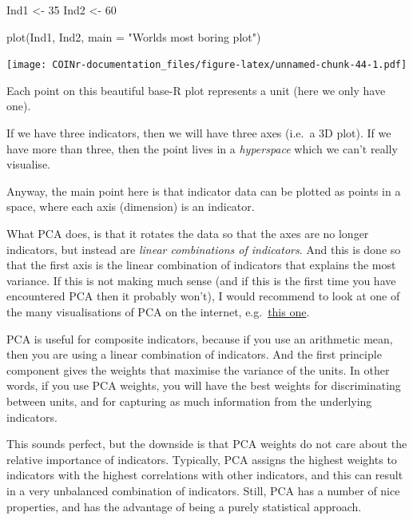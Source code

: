 \documentclass[
]{book}
\newenvironment{Shaded}{\begin{snugshade}}{\end{snugshade}}
\newcommand{\AttributeTok}[1]{\textcolor[rgb]{0.77,0.63,0.00}{#1}}
\newcommand{\DecValTok}[1]{\textcolor[rgb]{0.00,0.00,0.81}{#1}}
\newcommand{\FunctionTok}[1]{\textcolor[rgb]{0.00,0.00,0.00}{#1}}
\newcommand{\NormalTok}[1]{#1}
\newcommand{\OtherTok}[1]{\textcolor[rgb]{0.56,0.35,0.01}{#1}}
\newcommand{\StringTok}[1]{\textcolor[rgb]{0.31,0.60,0.02}{#1}}
\begin{document}
\begin{Shaded}
\begin{Highlighting}[]
\NormalTok{Ind1 }\OtherTok{\textless{}{-}} \DecValTok{35}
\NormalTok{Ind2 }\OtherTok{\textless{}{-}} \DecValTok{60}

\FunctionTok{plot}\NormalTok{(Ind1, Ind2, }\AttributeTok{main =} \StringTok{"World\textquotesingle{}s most boring plot"}\NormalTok{)}
\end{Highlighting}
\end{Shaded}

\texttt{[image: COINr-documentation\_files/figure-latex/unnamed-chunk-44-1.pdf]}

Each point on this beautiful base-R plot represents a unit (here we only have one).

If we have three indicators, then we will have three axes (i.e.~a 3D plot). If we have more than three, then the point lives in a \emph{hyperspace} which we can't really visualise.

Anyway, the main point here is that indicator data can be plotted as points in a space, where each axis (dimension) is an indicator.

What PCA does, is that it rotates the data so that the axes are no longer indicators, but instead are \emph{linear combinations of indicators}. And this is done so that the first axis is the linear combination of indicators that explains the most variance. If this is not making much sense (and if this is the first time you have encountered PCA then it probably won't), I would recommend to look at one of the many visualisations of PCA on the internet, e.g.~\href{https://setosa.io/ev/principal-component-analysis/}{this one}.

PCA is useful for composite indicators, because if you use an arithmetic mean, then you are using a linear combination of indicators. And the first principle component gives the weights that maximise the variance of the units. In other words, if you use PCA weights, you will have the best weights for discriminating between units, and for capturing as much information from the underlying indicators.

This sounds perfect, but the downside is that PCA weights do not care about the relative importance of indicators. Typically, PCA assigns the highest weights to indicators with the highest correlations with other indicators, and this can result in a very unbalanced combination of indicators. Still, PCA has a number of nice properties, and has the advantage of being a purely statistical approach.
\end{document}
